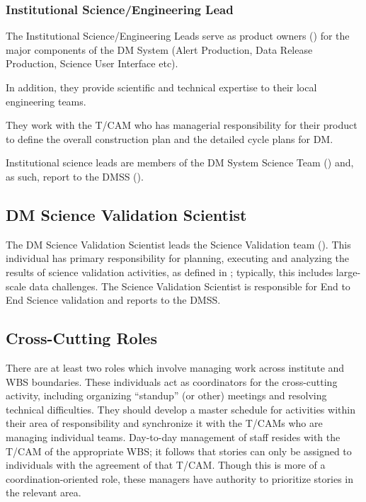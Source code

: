 \subsubsection{Institutional Science/Engineering Lead \label{role:scilead}}

The Institutional Science/Engineering Leads serve as product owners () for the major components of the DM System (\gls{Alert Production}, Data \gls{Release} Production, Science User Interface etc).

In addition, they provide scientific and technical expertise to their local engineering teams.

They work with the \gls{T/CAM} who has managerial responsibility for their product to define the overall construction plan and the detailed cycle plans for DM.

Institutional science leads are members of the DM System Science Team () and, as such, report to the \gls{DMSS} ().

\subsection{DM Science \gls{Validation} Scientist}
\label{role:dmsvs}

The DM Science \gls{Validation} Scientist leads the Science \gls{Validation} team ().
This individual has primary responsibility for planning, executing and analyzing the results of science validation activities, as defined in ; typically, this includes large-scale data challenges.
The Science \gls{Validation} Scientist is responsible for End to End Science validation and reports to the \gls{DMSS}.

\subsection{Cross-Cutting Roles}\label{role:crosscut}

There are at least two roles which involve managing work across institute and \gls{WBS} boundaries.
These individuals act as coordinators for the cross-cutting activity, including organizing ``standup'' (or other) meetings and resolving technical difficulties.
They should develop a master schedule for activities within their area of responsibility and synchronize it with the T/CAMs who are managing individual teams.
Day-to-day management of staff resides with the \gls{T/CAM} of the appropriate \gls{WBS}; it follows that stories can only be assigned to individuals with the agreement of that \gls{T/CAM}.
Though this is more of a coordination-oriented role, these managers have authority to prioritize stories in the relevant area.

